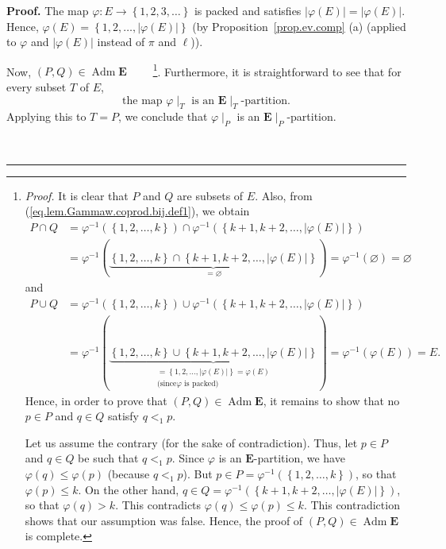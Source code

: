 \documentclass[numbers=enddot,12pt,final,onecolumn,notitlepage,abstracton]{scrartcl}
\theoremstyle{definition}
\newenvironment{proof}[1][Proof]{\noindent\textbf{#1.} }{\ \rule{0.5em}{0.5em}}
\newenvironment{verlong}{}{}
\newcommand{\Adm}{\operatorname{Adm}}
\newcommand{\EE}{{\mathbf{E}}}
\begin{document}
\begin{verlong}
\begin{proof}
The map $\varphi : E \to \left\{ 1, 2, 3, \ldots \right\}$ is packed
and satisfies
$\left| \varphi\left(E\right) \right| = \left| \varphi\left(E\right) \right|$.
Hence, $\varphi\left(  E\right)  =\left\{  1,2,\ldots,\left\vert
\varphi\left(  E\right)  \right\vert \right\}  $
(by Proposition~\ref{prop.ev.comp} (a) (applied to $\varphi$ and
$\left| \varphi\left(E\right) \right|$
instead of $\pi$ and $\ell$)).

Now, $\left(  P,Q\right)  \in \Adm \EE$%
\ \ \ \ \footnote{\textit{Proof.} It is clear that $P$ and $Q$ are subsets of
$E$. Also, from (\ref{eq.lem.Gammaw.coprod.bij.def1}), we obtain
\begin{align*}
P\cap Q  &  =\varphi^{-1}\left(  \left\{  1,2,\ldots,k\right\}  \right)
\cap\varphi^{-1}\left(  \left\{  k+1,k+2,\ldots,\left\vert \varphi\left(
E\right)  \right\vert \right\}  \right) \\
&  =\varphi^{-1}\left(  \underbrace{\left\{  1,2,\ldots,k\right\}
\cap\left\{  k+1,k+2,\ldots,\left\vert \varphi\left(  E\right)  \right\vert
\right\}  }_{=\varnothing}\right)  =\varphi^{-1}\left(  \varnothing\right)
=\varnothing
\end{align*}
and
\begin{align*}
P\cup Q  &  =\varphi^{-1}\left(  \left\{  1,2,\ldots,k\right\}  \right)
\cup\varphi^{-1}\left(  \left\{  k+1,k+2,\ldots,\left\vert \varphi\left(
E\right)  \right\vert \right\}  \right) \\
&  =\varphi^{-1}\left(  \underbrace{\left\{  1,2,\ldots,k\right\}
\cup\left\{  k+1,k+2,\ldots,\left\vert \varphi\left(  E\right)  \right\vert
\right\}  }_{\substack{=\left\{  1,2,\ldots,\left\vert \varphi\left(
E\right)  \right\vert \right\}  =\varphi\left(  E\right)  \\\text{(since
}\varphi\text{ is packed)}}}\right)  =\varphi^{-1}\left(  \varphi\left(
E\right)  \right)  =E.
\end{align*}
Hence, in order to prove that $\left( P, Q \right) \in \Adm
\EE$, it remains to show that no $p\in P$ and $q\in Q$ satisfy
$q<_{1}p$.
\par
Let us assume the contrary (for the sake of contradiction). Thus, let $p\in P$
and $q\in Q$ be such that $q<_{1}p$. Since $\varphi$ is an
$\EE$-partition, we have
$\varphi\left(  q\right)  \leq\varphi\left(  p\right)  $
(because $q<_{1}p$). But $p\in P=\varphi^{-1}\left(  \left\{  1,2,\ldots
,k\right\}  \right)  $, so that $\varphi\left(  p\right)  \leq k$. On the
other hand, $q\in Q=\varphi^{-1}\left(  \left\{  k+1,k+2,\ldots,\left\vert
\varphi\left(  E\right)  \right\vert \right\}  \right)  $, so that
$\varphi\left(  q\right)  >k$. This contradicts $\varphi\left(  q\right)
\leq\varphi\left(  p\right)  \leq k$. This contradiction shows that our
assumption was false. Hence, the proof of $\left(  P,Q\right)  \in
\Adm \EE$ is complete.}. Furthermore, it is
straightforward to see that for every subset $T$ of $E$,
\begin{equation}
\text{the map }\varphi\mid_{T}\text{ is an }
\EE\mid_{T}\text{-partition}.
\label{pf.lem.Gammaw.coprod.bij.a.1}
\end{equation}
Applying this to $T=P$, we conclude that $\varphi\mid_{P}$ is an
$\EE\mid_{P}$-partition.


\end{proof}
\end{verlong}
\end{document}
